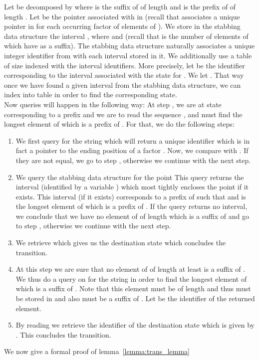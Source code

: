 \documentclass{article}
\newcommand{\?}{\mskip1.5mu}
\begin{document}
Let  be decomposed by  where  is the suffix of  of length  and  is the prefix of  of length . Let  be the pointer associated with  in  (recall that  associates a unique pointer in  for each occurring factor  of elements of ). We store in the  stabbing data structure the interval , where  and  (recall that  is the number of elements of  which have  as a suffix). The  stabbing data structure naturally associates a unique integer identifier from  with each interval stored in it. We additionally use a table  of size  indexed with the interval identifiers. More precisely, let  be the identifier corresponding to the interval associated with the state  for . We let . That  way once we have found a given interval from the  stabbing data structure, we can index into table  in order to find the corresponding state. 
\\Now queries will happen in the following way: At step , we are at state  corresponding to a prefix  and we are to read the sequence , and must find the longest element of  which is a prefix of . For that, we do the following steps:
\begin{enumerate}
\item We first query  for the string  which will return a unique identifier  which is in fact a pointer to the ending position of a factor . Now, we compare  with . If they are not equal, we go to step , otherwise we continue with the next step. 
\item We query the  stabbing data structure for the point  This query returns the interval (identified by a variable ) which most tightly encloses the point  if it exists. This interval (if it exists) corresponds to a prefix  of  such that  and  is the longest element of  which is a prefix of . If the query returns no interval, we conclude that we have no element of  of length  which is a suffix of  and go to step , otherwise we continue with the next step.
\item We retrieve  which gives us the destination state which concludes the transition. 
\item At this step we are sure that no element of  of length at least  is a suffix of . We thus do a query on  for the string  in order to find the longest element of  which is a suffix of . Note that this element must be of length  and thus must be stored in  and also must be a suffix of . Let  be the identifier of the returned element. 
\item By reading  we retrieve the identifier of the destination state which is given by . This concludes the transition. 
\end{enumerate}
We now give a formal proof of lemma~\ref{lemma:trans_lemma}
\end{document}
